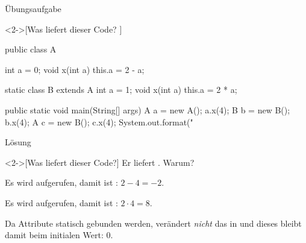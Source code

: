 \begin{frame}[c,fragile]{Übungsaufgabe}
    \begin{exercise}<2->[Was liefert dieser Code? ]\label{tsk:java-bindings-result}
\begin{plainjava}[morekeywords={[3]{A,B}}]
public class A {
    int a = 0;
    void x(int a) { this.a = 2 - a; }

    static class B extends A {
        int a = 1;
        void x(int a) { this.a = 2 * a; }
    }

    public static void main(String[] args) {
        A a = new A(); a.x(4);
        B b = new B(); b.x(4);
        A c = new B(); c.x(4);
        System.out.format("%
    }
}
\end{plainjava}
    \end{exercise}
\end{frame}

\begin{frame}[c]{Lösung}
    \begin{solve}<2->[Was liefert dieser Code?]
        Er liefert . Warum?
        \begin{description}[XX:]
            \item[-2] Es wird  aufgerufen, damit ist : \(2 - 4 = -2\).
            \item[8] Es wird  aufgerufen, damit ist : \(2 \cdot 4 = 8\).
            \item[0] Da Attribute statisch gebunden werden, verändert  \emph{nicht} das  in  und dieses bleibt damit beim initialen Wert: \(0\).
        \end{description}
    \end{solve}
\end{frame}


